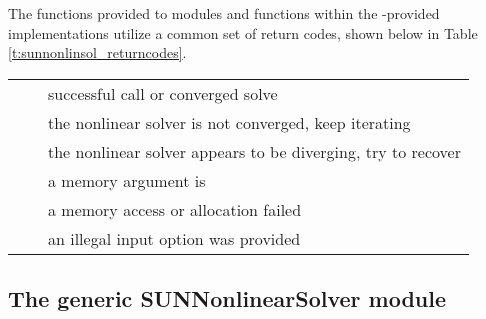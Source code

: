 The functions provided to {\sunnonlinsol} modules and functions within
the {\sundials}-provided {\sunnonlinsol} implementations utilize a
common set of return codes, shown below in Table \ref{t:sunnonlinsol_returncodes}.

\newlength{\ColumnOneA}
\newlength{\ColumnTwoA}
\newlength{\ColumnThreeA}
\setlength{\ColumnThreeA}{\textwidth}
\addtolength{\ColumnThreeA}{-0.5in}
\addtolength{\ColumnThreeA}{-\ColumnOneA}
\addtolength{\ColumnThreeA}{-\ColumnTwoA}

\label{t:sunnonlinsol_returncodes}
\begin{xtabular}{|p{\ColumnOneA}|p{\ColumnTwoA}|p{\ColumnThreeA}|}
     &   & successful call or converged solve
\\[1mm]
    &   & the nonlinear solver is not
                                      converged, keep iterating 
\\[1mm]
 &   & the nonlinear solver appears to
                                       be diverging, try to recover
\\[1mm]
   &  & a memory argument is 
\\[1mm]
   &  & a memory access or allocation failed
\\[1mm]
  &  & an illegal input option was provided
\\
\end{xtabular}
\bigskip


\subsection{The generic SUNNonlinearSolver module}
\label{ss:sunnonlinsol_generic}

